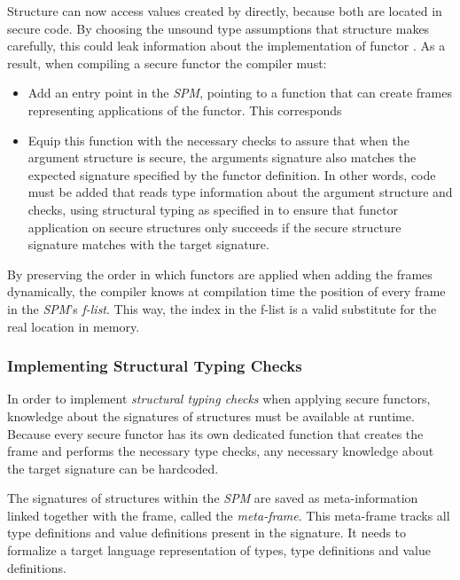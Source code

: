 \begin{description}
Structure  can now access values created by  directly, because both are located in secure code.
By choosing the unsound type assumptions that structure  makes carefully, this could leak information about the implementation of functor .
As a result, when compiling a secure functor the compiler must:
\begin{itemize}
\item Add an entry point in the \emph{SPM}, pointing to a function that can create frames representing applications of the functor. 
This corresponds
\item Equip this function with the necessary checks to assure that when the argument structure is secure, the arguments signature also matches the expected signature specified by the functor definition.
In other words, code must be added that reads type information about the argument structure and checks, using structural typing as specified in  to ensure that functor application on secure structures only succeeds if the secure structure signature matches with the target signature.
\end{itemize}

By preserving the order in which functors are applied when adding the frames dynamically, the compiler knows at compilation time the position of every frame in the \emph{SPM}'s \emph{f-list}.
This way, the index in the f-list is a valid substitute for the real location  in memory.
\end{description}

\subsubsection{Implementing Structural Typing Checks}
In order to implement \emph{structural typing checks} when applying secure functors, knowledge about the signatures of structures must be available at runtime.
Because every secure functor has its own dedicated function that creates the frame and performs the necessary type checks, any necessary knowledge about the target signature can be hardcoded.

The signatures of structures within the \emph{SPM} are saved as meta-information linked together with the frame, called the \emph{meta-frame}.
This meta-frame tracks all type definitions and value definitions present in the signature.
It needs to formalize a target language representation of types, type definitions and value definitions.



